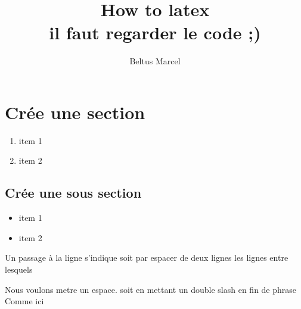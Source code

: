 \documentclass[fontsize=10pt]{article}
\title{\textbf{How to latex}\\ il faut regarder le code ;)}
\author{Beltus Marcel}
\date{}
\begin{document}
\maketitle %

\section{Crée une section}
\begin{enumerate} %
\item item 1%
\item item 2 %
\end{enumerate} %
\subsection{Crée une sous section}
\begin{itemize} %
\item item 1%
\item item 2 %
\end{itemize} %
Un passage à la ligne s'indique soit par espacer de deux lignes les lignes entre lesquels 

Nous voulons metre un espace. soit en mettant un double slash en fin de phrase\\

Comme ici
\end{document}
